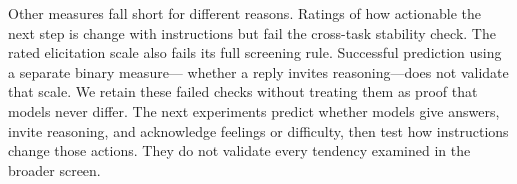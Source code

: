 Other measures fall short for different reasons. Ratings of how actionable the next step is change with instructions but fail
the cross-task stability check. The rated elicitation scale also fails its full
screening rule. Successful prediction using a separate binary measure---
whether a reply invites reasoning---does not validate that scale. We retain
these failed checks without treating them as proof that models never differ. The next experiments predict whether models give answers, invite reasoning,
and acknowledge feelings or difficulty, then test how instructions change those actions. They do not validate
every tendency examined in the broader screen.
